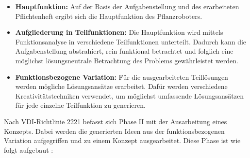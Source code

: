 \begin{itemize}
	\item \textbf{Hauptfunktion:} Auf der Basis der Aufgabenstellung und des erarbeiteten Pflichtenheft ergibt sich die Hauptfunktion des Pflanzroboters.
	
	\item \textbf{Aufgliederung in Teilfunktionen:} Die Hauptfunktion wird mittels Funktionsanalyse in verschiedene Teilfunktionen unterteilt. Dadurch kann die Aufgabenstellung abstrahiert, rein funktional betrachtet und folglich eine möglichst lösungsneutrale Betrachtung des Problems gewährleistet werden.
	
	\item \textbf{Funktionsbezogene Variation:} Für die ausgearbeiteten Teillösungen werden mögliche Lösungsansätze erarbeitet. Dafür werden verschiedene Kreativitätstechniken verwendet, um möglichst umfassende Lösungsansätzen für jede einzelne Teilfunktion zu generieren.

\end{itemize}

Nach  VDI-Richtlinie 2221 befasst sich Phase II mit der Ausarbeitung eines Konzepts. Dabei werden die generierten Ideen aus der funktionsbezogenen Variation aufgegriffen und zu einem Konzept ausgearbeitet. Diese Phase ist wie folgt aufgebaut \cite{vdi2221}:


